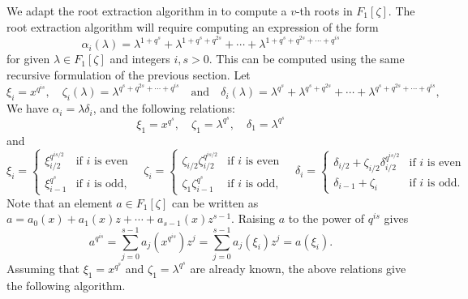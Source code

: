 \documentclass[12pt]{article}
\theoremstyle{plain}
\theoremstyle{definition}
\newcounter{algorithm}
\begin{document}
We adapt the root extraction algorithm in \cite{doliskanischost2011} to compute a $v$-th roots in 
$F_1[\zeta]$. 
The root extraction algorithm will require computing an expression of the form
$$
\alpha_i(\lambda) = \lambda^{1 + q^s} + \lambda^{1 + q^s + q^{2s}} + \cdots + \lambda^{1 + q^s + 
	q^{2s} + \cdots + q^{is}}
$$
for given $\lambda \in F_1[\zeta]$ and integers $i, s > 0$. This can be computed using the same 
recursive formulation of the previous section. Let
$$
\xi_i = x^{q^{is}},
\quad 
\zeta_i(\lambda) = \lambda^{q^s + q^{2s} + \cdots + q^{is}} 
\quad\text{and}\quad 
\delta_i(\lambda) = \lambda^{q^s} + \lambda^{q^s + q^{2s}} + \cdots + \lambda^{q^s + q^{2s} + 
	\cdots + q^{is}},
$$ 
We have $\alpha_i=\lambda \delta_i$, and the following relations:
$$\xi_1 = x^{q^s}, \quad \zeta_1 = \lambda^{q^s}, \quad \delta_1 = \lambda^{q^s}$$
and
$$
\xi_i =
\begin{cases}
\xi_{i / 2}^{q^{is / 2}} & \text{if $i$ is even}  \\
\xi_{i - 1}^{q^s} & \text{if $i$ is odd,}
\end{cases} \quad
\zeta_i = 
\begin{cases}
\zeta_{i / 2}\zeta_{i / 2}^{q^{is / 2}} & \text{if $i$ is even}  \\
\zeta_1\zeta_{i - 1}^{q^s} & \text{if $i$ is odd,}
\end{cases} \quad
\delta_i = 
\begin{cases}
\delta_{i / 2} + \zeta_{i / 2}\delta_{i / 2}^{q^{is / 2}} & \text{if $i$ is even}  \\
\delta_{i-1} + \zeta_i & \text{if $i$ is odd.}
\end{cases}$$
Note that an element $a \in F_1[\zeta]$ can be written as $a = a_0(x) + a_1(x)z + \cdots + a_{s - 
	1}(x)z^{s - 1}$. Raising $a$ to the power of $q^{is}$ gives
\[a^{q^{is}} = \sum_{j = 0}^{s - 1} a_j(x^{q^{is}})z^j = \sum_{j = 0}^{s - 1} a_j(\xi_i)z^j = 
a(\xi_i).\]
Assuming that $\xi_1=x^{q^s}$ and $\zeta_1=\lambda^{q^s}$ are already known, the above 
relations give the following algorithm.
\end{document}
